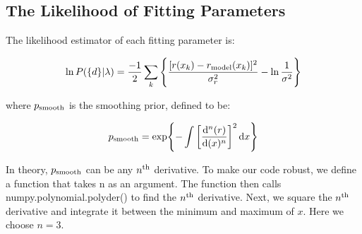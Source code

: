 \subsection{The Likelihood of Fitting Parameters}
\label{subsec:likelihood}

The likelihood estimator of each fitting parameter is:

\begin{equation}
\label{likelihood}
\ln{P(\{d\}|\lambda)} = \frac{-1}{2}\sum_{k} \qty{\frac{[r(x_k) -r_{\rm model}(x_k)]^2}{\sigma_r^2} - \ln{\frac{1}{\sigma^2}}}
\end{equation}

where $p_{\rm smooth}$ is the smoothing prior, defined to be:

\begin{equation}
\label{smoothing_prior}
p_{\rm smooth} = \exp{-\int \qty[\dv[n]{(r)}{(x)}]^2 \dd{x}}
\end{equation}

In theory, $p_{\rm smooth}$ can be any $n^{\rm th}$ derivative. To make our code robust, we define a function that takes n as an argument. The function then calls numpy.polynomial.polyder() to find the $n^{\rm th}$ derivative. Next, we square the $n^{\rm th}$ derivative and integrate it between the minimum and maximum of $x$. Here we choose $n = 3$.